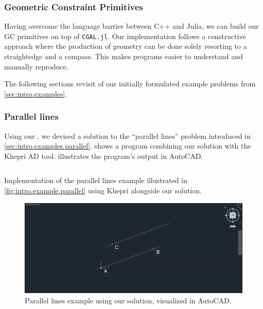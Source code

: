 \subsubsection{Geometric Constraint Primitives}%
\label{sec:solution.impl.gcps}

Having overcome the language barrier between C++ and Julia, we can build our
\ac{GC} primitives on top of \texttt{CGAL.jl}.  Our implementation follows a
constructive approach where the production of geometry can be done solely
resorting to a straightedge and a compass.  This makes programs easier to
understand and manually reproduce.

The following sections revisit of our initially formulated example problems from
\cref{sec:intro.examples}.

\subsubsection*{Parallel lines}%
\label{sec:solution.impl.gcps.parallel}

Using our \primitives{}, we devised a solution to the ``parallel lines'' problem
introduced in \cref{sec:intro.examples.parallel}.
 shows a program combining our solution
with the Khepri \ac{AD} tool.  illustrates
the program's output in AutoCAD.

\begin{listing}[htbp]
  \inputminted{julia}{jl/ex_parallel.jl}
  \caption{\label{lst:solution.impl.gcps.parallel}
    Implementation of the parallel lines example illustrated in
    \cref{fig:intro.example.parallel} using Khepri alongside our solution.}
\end{listing}

\begin{figure}[htbp]
  \includegraphics[width=\linewidth]{fig/autocad-parallel} 
  \caption{\label{fig:solution.impl.gcps.parallel}
    Parallel lines example using our solution, visualized in AutoCAD\@.}
\end{figure}

